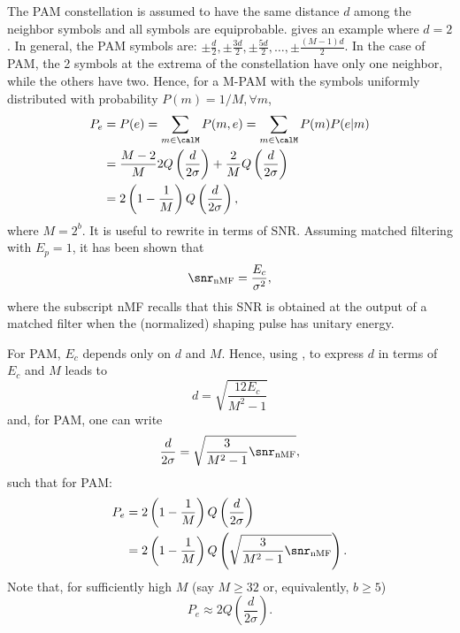 The PAM constellation is assumed to have the same distance $d$ among the neighbor symbols and all symbols are equiprobable.  gives an example where $d=2$.
In general, the PAM symbols are: $\pm \frac{d}{2}, \pm \frac{3d}{2}, \pm \frac{5d}{2}, \ldots, \pm \frac{(M-1)d}{2}$.
In the case of PAM, the 2 symbols at the extrema of the constellation have only one neighbor, while the others have two. Hence, for a M-PAM with the symbols uniformly distributed with probability $P(m)=1/M, \forall m$,
\begin{align}
P_e &= P(e) = \sum_{m \in \calM} P(m,e) = \sum_{m \in \calM} P(m) P(e|m) \\
&= \frac{M-2}{M} 2 Q \left(\frac{d}{2\sigma} \right) + \frac{2}{M}  Q\left( \frac{d}{2\sigma} \right) \\
&= 2 \left(1 - \frac{1}{M} \right) Q\left( \frac{d}{2\sigma} \right),
\label{eq:pam_pe_general}
\end{align}
where $M=2^b$. It is useful to rewrite  in terms of SNR. Assuming matched filtering with $E_p=1$, it has been shown that
\begin{equation}
\snr_{\textrm{nMF}} = \frac{E_c}{\sigma^2},
\label{eq:snrnormalizedMF}
\end{equation}
where the subscript nMF recalls that this SNR is obtained at the output of a matched filter when the (normalized) shaping pulse has unitary energy.

For PAM, $E_c$ depends only on $d$ and $M$. Hence, using , 
to express $d$ in terms of $E_c$ and $M$ leads to
\begin{equation}
d = \sqrt{ \frac{12 E_c}{M^2 - 1} }
\label{eq:d_pam}
\end{equation}
and, for PAM, one can write
\begin{equation}
\frac{d}{2 \sigma} = \sqrt{\frac{3}{M^2-1} \snr_{\textrm{nMF}}},
\label{eq:pamdistanceoversigma}
\end{equation}
such that for PAM:
\begin{align}
	P_e  &= 2 \left(1 - \frac 1 M\right) Q \left( \frac{d}{2 \sigma} \right) \label{eq:pam_pe_snr} \\
	&=  2 \left(1 - \frac 1 M\right) Q \left( \sqrt{\frac{3}{M^2-1} \snr_{\textrm{nMF}}} \right).
\end{align}
Note that, for sufficiently high $M$ (say $M \ge 32$ or, equivalently, $b \ge 5$)
\[
P_e \approx 2 Q \left( \frac{d}{2 \sigma} \right).
\]

